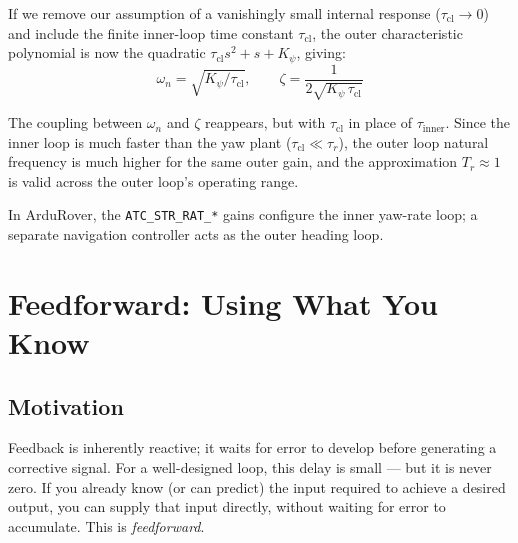 \documentclass[../../book.tex]{subfiles}
\begin{document}
If we remove our assumption of a vanishingly small internal response ($\tau_{\mathrm{cl}} \to 0$) and include the finite inner-loop time constant $\tau_\mathrm{cl}$, the outer
characteristic polynomial is now the quadratic $\tau_\mathrm{cl} s^2 + s + K_\psi$, giving:
\[
  \omega_n = \sqrt{K_\psi/\tau_\mathrm{cl}}, \qquad
  \zeta = \frac{1}{2\sqrt{K_\psi\,\tau_\mathrm{cl}}}
\]

The coupling between $\omega_n$ and $\zeta$ reappears, but with $\tau_\mathrm{cl}$
in place of $\tau_{\mathrm{inner}}$.  Since the inner loop is much faster than the yaw plant
($\tau_\mathrm{cl} \ll \tau_r$), the outer loop natural frequency is much higher
for the same outer gain, and the approximation $T_r \approx 1$ is valid across
the outer loop's operating range.

In ArduRover, the \texttt{ATC\_STR\_RAT\_*} gains configure the inner yaw-rate
loop; a separate navigation controller acts as the outer heading loop.


\section{Feedforward: Using What You Know}
\label{sec:feedforward}

\subsection{Motivation}

Feedback is inherently reactive; it waits for error to develop before
generating a corrective signal.  For a well-designed loop, this delay is
small --- but it is never zero.  If you already know (or can predict) the input
required to achieve a desired output, you can supply that input directly,
without waiting for error to accumulate.  This is \emph{feedforward}.
\end{document}
